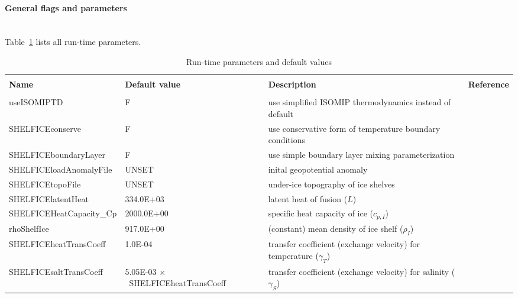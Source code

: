 \paragraph{General flags and parameters}
~ \\
%
Table~\ref{tab:pkg:shelfice:runtimeparms} lists all run-time parameters.
\begin{table}[!ht]
  \caption{Run-time parameters and default values
    \label{tab:pkg:shelfice:runtimeparms}}
  {\footnotesize
    \begin{tabular}{|lp{4cm}p{4cm}c|}
      \hline
      & & & \\
      \textbf{Name}  &  \textbf{Default value}  
      &  \textbf{Description}   &  \textbf{Reference}  \\
      & & & \\
      \hline \hline
      useISOMIPTD              & F
      &   use simplified ISOMIP thermodynamics instead of default
      &  %
      \\
      SHELFICEconserve         & F
      &   use conservative form of temperature boundary conditions
      &  %
      \\
      SHELFICEboundaryLayer    & F
      &   use simple boundary layer mixing parameterization
      &  %
      \\
      SHELFICEloadAnomalyFile  & UNSET
      &   inital geopotential anomaly
      &  %
      \\
      SHELFICEtopoFile         & UNSET
      &   under-ice topography of ice shelves
      &  %
      \\
      SHELFICElatentHeat       &  334.0E+03
      &   latent heat of fusion ($L$)
      &  %
      \\
      SHELFICEHeatCapacity\_Cp & 2000.0E+00
      &   specific heat capacity of ice ($c_{p,I}$)
      &  %
      \\
      rhoShelfIce              &  917.0E+00
      &   (constant) mean density of ice shelf ($\rho_{I}$)
      &  %
      \\
      SHELFICEheatTransCoeff   &    1.0E-04
      &   transfer coefficient (exchange velocity) for temperature
      ($\gamma_T$)
      &  %
      \\
      SHELFICEsaltTransCoeff   &   5.05E-03 $\times$~SHELFICEheatTransCoeff
      &   transfer coefficient (exchange velocity) for salinity
      ($\gamma_S$)
      &  %
      \\

\end{tabular}}
\end{table}
